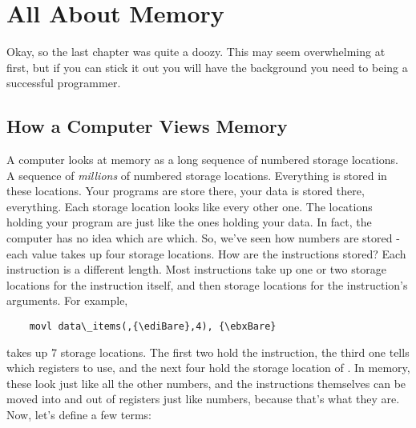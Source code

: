 \chapter{All About Memory}

% 
% 
% 
% 

Okay, so the last chapter was quite a doozy.  This may seem overwhelming
at first, but if you can stick it out you will have the background you need
to being a successful programmer.

\section{How a Computer Views Memory}

A computer looks at memory as a long sequence of numbered storage
locations.  A sequence of \emph{millions} of numbered
storage locations.  Everything is stored in these locations.  Your
programs are store there, your data is stored there, everything.  
Each storage location looks like every other one.  The locations 
holding your program are just like the ones holding your data.  In
fact, the computer has no idea which are which.  So, we've seen
how numbers are stored - each value takes up four storage locations.
How are the instructions stored?  Each instruction is a different
length.  Most instructions take up one or two storage locations for
the instruction itself, and then storage locations for the instruction's
arguments.  For example,

\begin{simpletyping}
\begin{lstlisting}
	movl data\_items(,{\ediBare},4), {\ebxBare}
\end{lstlisting}
\end{simpletyping}

takes up 7%
 storage locations.  The first two hold the instruction,
the third one tells which registers to use, and the next four hold
the storage location of .  In memory,
these look just like all the other numbers, and the instructions themselves
can be moved into and out of registers just like numbers, because that's
what they are.  Now, let's define a few terms:


